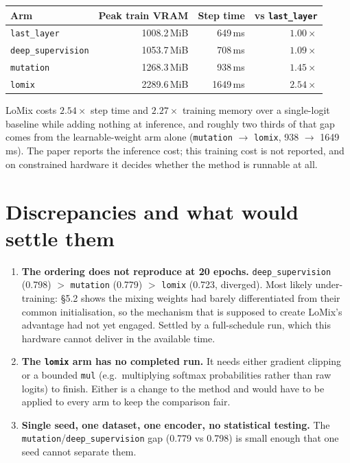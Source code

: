 \documentclass[11pt,a4paper]{article}
\newcommand{\code}[1]{\texttt{\small #1}}
\begin{document}
\begin{center}
\begin{tabular}{@{}lrrr@{}}
\toprule
\textbf{Arm} & \textbf{Peak train VRAM} & \textbf{Step time} &
\textbf{vs \code{last\_layer}} \\
\midrule
\code{last\_layer} & 1008.2\,MiB & 649\,ms & $1.00\times$ \\
\code{deep\_supervision} & 1053.7\,MiB & 708\,ms & $1.09\times$ \\
\code{mutation} & 1268.3\,MiB & 938\,ms & $1.45\times$ \\
\code{lomix} & 2289.6\,MiB & 1649\,ms & $\mathbf{2.54\times}$ \\
\bottomrule
\end{tabular}
\end{center}

LoMix costs $2.54\times$ step time and $2.27\times$ training memory over a
single-logit baseline while adding nothing at inference, and roughly two thirds
of that gap comes from the learnable-weight arm alone (\code{mutation}
$\rightarrow$ \code{lomix}, 938 $\rightarrow$ 1649\,ms). The paper reports the
inference cost; this training cost is not reported, and on constrained hardware
it decides whether the method is runnable at all.

\section{Discrepancies and what would settle them}

\begin{enumerate}
\item \textbf{The ordering does not reproduce at 20 epochs.}
\code{deep\_supervision} (0.798) $>$ \code{mutation} (0.779) $>$ \code{lomix}
(0.723, diverged). Most likely under-training: \S5.2 shows the mixing weights
had barely differentiated from their common initialisation, so the mechanism
that is supposed to create LoMix's advantage had not yet engaged. Settled by a
full-schedule run, which this hardware cannot deliver in the available time.
\item \textbf{The \code{lomix} arm has no completed run.} It needs either
gradient clipping or a bounded \code{mul} (e.g.\ multiplying softmax
probabilities rather than raw logits) to finish. Either is a change to the
method and would have to be applied to every arm to keep the comparison fair.
\item \textbf{Single seed, one dataset, one encoder, no statistical testing.}
The \code{mutation}/\code{deep\_supervision} gap (0.779 vs 0.798) is small
enough that one seed cannot separate them.
\end{enumerate}
\end{document}
